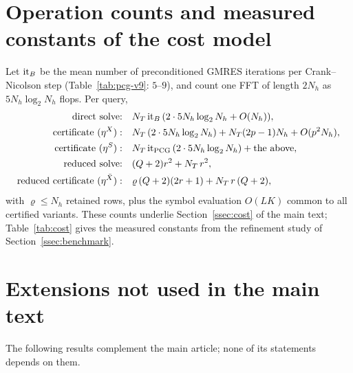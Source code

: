 \documentclass[supplement,hidelinks]{siamart251216}
\begin{document}
\section{Operation counts and measured constants of the cost model}
\label{sm:cost}
Let ${\rm it}_B$ be the mean number of preconditioned GMRES iterations per Crank--Nicolson step
(Table~\ref{tab:pcg-v9}: $5$--$9$), and count one FFT of length $2N_h$ as $5N_h\log_2N_h$
flops.  Per query,
\begin{align*}
 \text{direct solve:}&\quad N_T\,{\rm it}_B\,(2\cdot5N_h\log_2N_h+O(N_h)),\\
 \text{certificate }(\eta^X):&\quad N_T\,(2\cdot5N_h\log_2N_h)+N_T(2p-1)N_h+O(p^2N_h),\\
 \text{certificate }(\eta^S):&\quad N_T\,{\rm it}_{\rm PCG}\,(2\cdot5N_h\log_2N_h)+\text{the above},\\
 \text{reduced solve:}&\quad (Q+2)r^2+N_T\,r^2,\\
 \text{reduced certificate }(\eta^{\bar X}):&\quad \varrho\,(Q+2)(2r+1)+N_T\,r\,(Q+2),
\end{align*}
with $\varrho\le N_h$ retained rows, plus the symbol evaluation $O(LK)$ common to all certified variants.  These counts underlie Section~\ref{ssec:cost} of the main text;
Table~\ref{tab:cost} gives the measured constants from the refinement study of
Section~\ref{ssec:benchmark}.

\FloatBarrier
\section{Extensions not used in the main text}
\label{sm:extensions}
The following results complement the main article; none of its statements depends on them.
\end{document}
